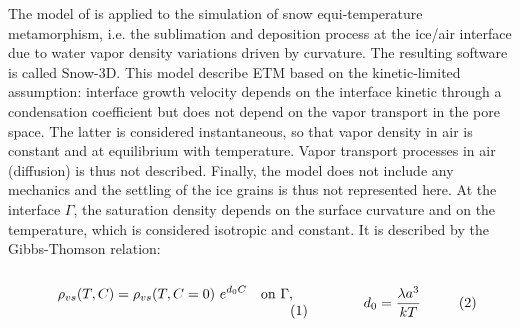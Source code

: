 \documentclass[draft,ms]{agujournal2019}
\begin{document}
The model of  is applied to the simulation of snow equi-temperature metamorphism, i.e. the sublimation and deposition process at the ice/air interface due to water vapor density variations driven by curvature. The resulting software is called Snow-3D. This model describe ETM based on the kinetic-limited assumption: interface growth velocity depends on the interface kinetic through a condensation coefficient but does not depend on the vapor transport in the pore space. The latter is considered instantaneous, so that vapor density in air is constant and at equilibrium with temperature. Vapor transport processes in air (diffusion) is thus not described. Finally, the model does not include any mechanics and the settling of the ice grains is thus not represented here.
%
%
At the interface $\Gamma$, the saturation density depends on the surface curvature and on the temperature, which is considered isotropic and constant. It is described by the Gibbs-Thomson relation:\\
\begin{subequations}\label{equ:gibbs}
\begin{minipage}{0.55\textwidth}\begin{align}
    \rho_{vs}(T,C)=\rho_{vs}(T, C=0)\ e^{d_0 C}\quad \text{on}\ \Gamma\text{,}
\end{align}\end{minipage}
\begin{minipage}{0.35\textwidth}\begin{align}\label{equ:d0}
    d_0 = \frac{\lambda a^3}{k T}
\end{align}\end{minipage}
\end{subequations}
\end{document}
